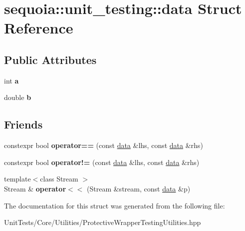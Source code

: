 \hypertarget{structsequoia_1_1unit__testing_1_1data}{}\section{sequoia\+::unit\+\_\+testing\+::data Struct Reference}
\label{structsequoia_1_1unit__testing_1_1data}
\subsection*{Public Attributes}
\begin{DoxyCompactItemize}
\item 
\mbox{\label{structsequoia_1_1unit__testing_1_1data_a66c4872883f9a04b348cdc12f59b8b78}} 
int {\bfseries a}
\item 
\mbox{\label{structsequoia_1_1unit__testing_1_1data_acae885801a02c731760e76886b8cc2cf}} 
double {\bfseries b}
\end{DoxyCompactItemize}
\subsection*{Friends}
\begin{DoxyCompactItemize}
\item 
\mbox{\label{structsequoia_1_1unit__testing_1_1data_a5bbe66515dc2a9e627f3cc6154488b1f}} 
constexpr bool {\bfseries operator==} (const \mbox{\hyperlink{structsequoia_1_1unit__testing_1_1data}{data}} \&lhs, const \mbox{\hyperlink{structsequoia_1_1unit__testing_1_1data}{data}} \&rhs)
\item 
\mbox{\label{structsequoia_1_1unit__testing_1_1data_a8c46d0f6a0a763e38e442e5ece91776c}} 
constexpr bool {\bfseries operator!=} (const \mbox{\hyperlink{structsequoia_1_1unit__testing_1_1data}{data}} \&lhs, const \mbox{\hyperlink{structsequoia_1_1unit__testing_1_1data}{data}} \&rhs)
\item 
\mbox{\label{structsequoia_1_1unit__testing_1_1data_a86ba44b8da6ba7f93585ab63e5d84e02}} 
{\footnotesize template$<$class Stream $>$ }\\Stream \& {\bfseries operator$<$$<$} (Stream \&stream, const \mbox{\hyperlink{structsequoia_1_1unit__testing_1_1data}{data}} \&p)
\end{DoxyCompactItemize}


The documentation for this struct was generated from the following file\+:\begin{DoxyCompactItemize}
\item 
Unit\+Tests/\+Core/\+Utilities/Protective\+Wrapper\+Testing\+Utilities.\+hpp\end{DoxyCompactItemize}
